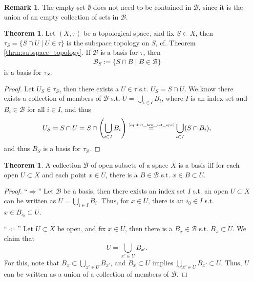 \documentclass[12pt, a4paper]{article}
\numberwithin{equation}{section}
\theoremstyle{definition}
\theoremstyle{definition}
\newtheorem{remark}[thm]{Remark} %
\newtheorem{theorem}[thm]{Theorem}
\begin{document}
		\begin{remark}
			The empty set $\emptyset$ does not need to be contained in $\mathscr B$, since it is the union of an empty collection of sets in $\mathscr B$.
		\end{remark}
	
		\begin{theorem}\label{thrm:subspace_basis}
			Let $(X, \tau)$ be a topological space, and fix $S\subset X$, then 
			$\tau_S = \{S \cap U \mid U\in \tau\}$ is the subspace topology on $S$, cf. Theorem \ref{thrm:subspace_topology}. If $\mathscr B$ is a basis for $\tau$, then 
			\begin{align}
				\mathscr B_S := \{S \cap B \mid B\in\mathscr B\}
			\end{align}
			is a basis for $\tau_S$.
		\end{theorem}
		
		\begin{proof}
			Let $U_S \in \tau_S$, then there exists a $U\in \tau$ s.t. $U_S = S\cap U$. We know there exists a collection of members of $\mathscr B$ s.t. $U = \bigcup_{i\in I}B_i$, where $I$ is an index set and $B_i\in\mathscr B$ for all $i\in I$, and thus 
			$$U_S = S\cap U = S\cap \left(\bigcup_{i\in I}B_i\right) \overset{\tiny\eqref{eq:dist_law_set_ops}}{=} \bigcup_{i\in I}(S\cap B_i),$$
			and thus $B_S$ is a basis for $\tau_S$.
		\end{proof}
	
		\begin{theorem}\label{thrm:collection_of_subsets_basis}
			A collection $\mathscr B$ of open subsets of a space $X$ is a basis iff for each open $U\subset X$ and each point $x\in U$, there is a $B\in\mathscr B$ s.t. $x\in B\subset U$.
		\end{theorem}
	
		\begin{proof}
			\enquote{$\Longrightarrow$} Let $\mathscr B$ be a basis, then there exists an index set $I$ s.t. an open $U\subset X$ can be written as $U = \bigcup_{i\in I}B_i$. Thus, for $x\in U$, there is an $i_0\in I$ s.t. $x\in B_{i_0}\subset U$.
			
			\enquote{$\Longleftarrow$} Let $U\subset X$ be open, and fix $x\in U$, then there is a $B_x\in \mathscr B$ s.t. $B_x\subset U$. We claim that $$U = \bigcup_{x'\in U}B_{x'}.$$ For this, note that $B_x\subset \bigcup_{x'\in U}B_{x'}$, and $B_x\subset U$ implies $\bigcup_{x'\in U}B_{x'}\subset U$. Thus, $U$ can be written as a union of a collection of members of $\mathscr B$.
		\end{proof}
	
\end{document}

